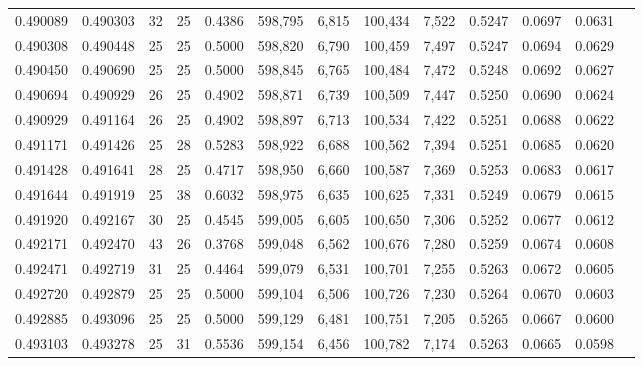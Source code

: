 \begin{tabular}{rrrrrrrrrrrrr}
0.490089 & 0.490303 &    32 &  25 &                                     0.4386 & 598,795 &   6,815 & 100,434 &   7,522 & 0.5247 & 0.0697 & 0.0631 \\
0.490308 & 0.490448 &    25 &  25 &                                     0.5000 & 598,820 &   6,790 & 100,459 &   7,497 & 0.5247 & 0.0694 & 0.0629 \\
0.490450 & 0.490690 &    25 &  25 &                                     0.5000 & 598,845 &   6,765 & 100,484 &   7,472 & 0.5248 & 0.0692 & 0.0627 \\
0.490694 & 0.490929 &    26 &  25 &                                     0.4902 & 598,871 &   6,739 & 100,509 &   7,447 & 0.5250 & 0.0690 & 0.0624 \\
0.490929 & 0.491164 &    26 &  25 &                                     0.4902 & 598,897 &   6,713 & 100,534 &   7,422 & 0.5251 & 0.0688 & 0.0622 \\
0.491171 & 0.491426 &    25 &  28 &                                     0.5283 & 598,922 &   6,688 & 100,562 &   7,394 & 0.5251 & 0.0685 & 0.0620 \\
0.491428 & 0.491641 &    28 &  25 &                                     0.4717 & 598,950 &   6,660 & 100,587 &   7,369 & 0.5253 & 0.0683 & 0.0617 \\
0.491644 & 0.491919 &    25 &  38 &                                     0.6032 & 598,975 &   6,635 & 100,625 &   7,331 & 0.5249 & 0.0679 & 0.0615 \\
0.491920 & 0.492167 &    30 &  25 &                                     0.4545 & 599,005 &   6,605 & 100,650 &   7,306 & 0.5252 & 0.0677 & 0.0612 \\
0.492171 & 0.492470 &    43 &  26 &                                     0.3768 & 599,048 &   6,562 & 100,676 &   7,280 & 0.5259 & 0.0674 & 0.0608 \\
0.492471 & 0.492719 &    31 &  25 &                                     0.4464 & 599,079 &   6,531 & 100,701 &   7,255 & 0.5263 & 0.0672 & 0.0605 \\
0.492720 & 0.492879 &    25 &  25 &                                     0.5000 & 599,104 &   6,506 & 100,726 &   7,230 & 0.5264 & 0.0670 & 0.0603 \\
0.492885 & 0.493096 &    25 &  25 &                                     0.5000 & 599,129 &   6,481 & 100,751 &   7,205 & 0.5265 & 0.0667 & 0.0600 \\
0.493103 & 0.493278 &    25 &  31 &                                     0.5536 & 599,154 &   6,456 & 100,782 &   7,174 & 0.5263 & 0.0665 & 0.0598 \\

\end{tabular}
